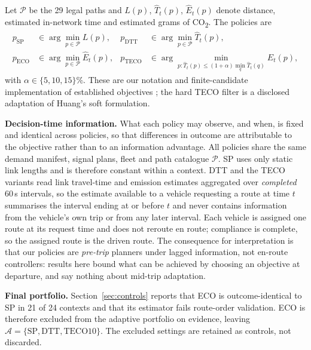 \documentclass[10pt,a4paper]{article}
\newcommand{\CO}{CO\textsubscript{2}}
\begin{document}
Let $\mathcal P$ be the 29 legal paths and $L(p)$, $\widehat T_t(p)$, $\widehat E_t(p)$ denote distance, estimated in-network time and estimated grams of \CO. The policies are
\begin{align}
p_{\mathrm{SP}}&\in\arg\min_{p\in\mathcal P}L(p), &
p_{\mathrm{DTT}}&\in\arg\min_{p\in\mathcal P}\widehat T_t(p),\\
p_{\mathrm{ECO}}&\in\arg\min_{p\in\mathcal P}\widehat E_t(p), &
p_{\mathrm{TECO}}&\in\arg\min_{p:\widehat T_t(p)\le(1+\alpha)\min_q\widehat T_t(q)}\widehat E_t(p),
\end{align}
with $\alpha\in\{5,10,15\}\%$. These are our notation and finite-candidate implementation of established objectives \cite{R01,R03,R04,R05}; the hard TECO filter is a disclosed adaptation of Huang's soft formulation.

\textbf{Decision-time information.} What each policy may observe, and when, is fixed and identical across policies, so that differences in outcome are attributable to the objective rather than to an information advantage. All policies share the same demand manifest, signal plans, fleet and path catalogue $\mathcal P$. SP uses only static link lengths and is therefore constant within a context. DTT and the TECO variants read link travel-time and emission estimates aggregated over \emph{completed} 60\,s intervals, so the estimate available to a vehicle requesting a route at time $t$ summarises the interval ending at or before $t$ and never contains information from the vehicle's own trip or from any later interval. Each vehicle is assigned one route at its request time and does not reroute en route; compliance is complete, so the assigned route is the driven route. The consequence for interpretation is that our policies are \emph{pre-trip} planners under lagged information, not en-route controllers: results here bound what can be achieved by choosing an objective at departure, and say nothing about mid-trip adaptation.

\textbf{Final portfolio.} Section~\ref{sec:controls} reports that ECO is outcome-identical to SP in 21 of 24 contexts and that its estimator fails route-order validation. ECO is therefore excluded from the adaptive portfolio on evidence, leaving $\mathcal A=\{\mathrm{SP},\mathrm{DTT},\mathrm{TECO}10\}$. The excluded settings are retained as controls, not discarded.
\end{document}
